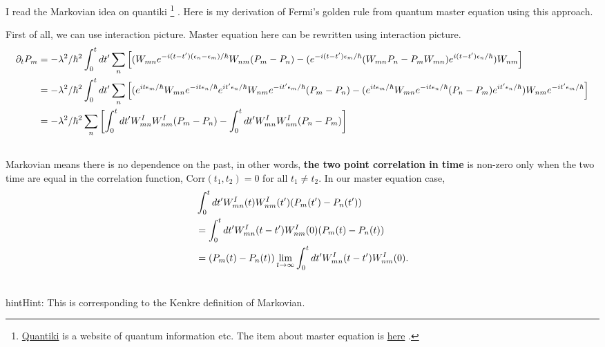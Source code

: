 \documentclass[letterpaper,10pt,english]{sphinxmanual}
\begin{document}
I read the Markovian idea on quantiki \footnote{
\href{http://www.quantiki.org/wiki/}{Quantiki} is a website of quantum information etc. The item about master equation is \href{http://www.quantiki.org/wiki/Master\_equation}{here} .
} . Here is my derivation of Fermi's golden rule from quantum master equation using this approach.

First of all, we can use interaction picture. Master equation here can be rewritten using interaction picture.
\begin{gather}
\begin{split}\partial_t P_m & =  -\lambda^2/\hbar^2 \int_0^t dt' \sum_n \left[ ( W_{mn} e^{-i(t-t')(\epsilon_n - \epsilon_m ) /\hbar }  W_{nm} (P_{m} - P_{n}) - (e^{-i(t-t')\epsilon_m/\hbar} ( W_{mn}P_{n} - P_{m}W_{m n} ) e^{i(t-t')\epsilon_n/\hbar} )W_{nm}  \right] \\
& = -\lambda^2/\hbar^2 \int_0^t dt' \sum_n \left[ ( e^{it\epsilon_m/\hbar}W_{mn} e^{-i t \epsilon_n/\hbar } e^{it'\epsilon_n/\hbar} W_{nm} e^{-it'\epsilon_m/\hbar} (P_{m} - P_{n}) - (e^{it\epsilon_m/\hbar}  W_{mn} e^{-it\epsilon_n/\hbar} (P_{n} - P_{m}) e^{it'\epsilon_n/\hbar} )W_{nm} e^{-it'\epsilon_m/\hbar} \right] \\
& = -\lambda^2/\hbar^2 \sum_n \left[  \int_0^t dt' W_{mn}^I W_{nm}^I(P_m-P_n) - \int_0^t dt' W_{mn}^I W_{nm}^I(P_n-P_m)  \right]\end{split}\notag\\\begin{split}\end{split}\notag
\end{gather}
Markovian means there is no dependence on the past, in other words, \textbf{the two point correlation in time} is non-zero only when the two time are equal in the correlation function, $\mathrm{Corr}(t_1,t_2)=0$ for all $t_1\not= t_2$. In our master equation case,
\begin{gather}
\begin{split}&\int_0^t dt' W_{mn}^I(t) W_{nm}^I(t')(P_m(t')-P_n(t')) \\
& = \int_0^t dt' W_{mn}^I(t-t') W_{nm}^I(0)(P_m(t)-P_n(t)) \\
& = (P_m(t)-P_n(t)) \lim_{t\rightarrow \infty}\int_0^t dt' W_{mn}^I(t-t') W_{nm}^I(0) .\end{split}\notag\\\begin{split}\end{split}\notag
\end{gather}
\begin{notice}{hint}{Hint:}
This is corresponding to the Kenkre definition of Markovian.
\end{notice}
\end{document}
